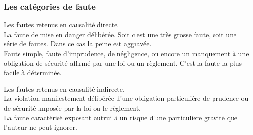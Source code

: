 \documentclass[10pt, a4paper, openany]{book}
\begin{document}
\subsubsection{Les catégories de faute}

Les fautes retenus en causalité directe. \\
La faute de mise en danger délibérée. Soit c'est une très grosse faute, soit une série de fautes. Dans ce cas la peine est aggravée. \\
Faute simple, faute d'imprudence, de négligence, ou encore un manquement à une obligation de sécurité affirmé par une loi ou un règlement. C'est la faute la plus facile à déterminée. 


Les fautes retenus en causalité indirecte. \\
La violation manifestement délibérée d'une obligation particulière de prudence ou de sécurité imposée par la loi ou le règlement. \\
La faute caractérisé exposant autrui à un risque d'une particulière gravité que l'auteur ne peut ignorer. 
\end{document}
